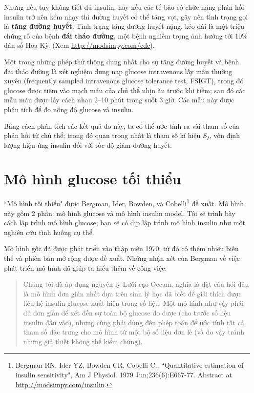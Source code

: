 \documentclass[12pt, openany]{book}
\theoremstyle{exercise}
\begin{document}
Nhưng nếu tuỵ không tiết đủ insulin, hay nếu các tế bào có chức năng phản hồi insulin trở nên kém nhạy thì đường huyết có thể tăng vọt, gây nên tình trạng gọi là {\bf tăng đường huyết}.  Tình trạng tăng đường huyết nặng, kéo dài là một triệu chứng rõ của bệnh {\bf đái tháo đường}, một bệnh nghiêm trọng ảnh hưởng tới 10\% dân số Hoa Kỳ. (Xem \url{http://modsimpy.com/cdc}).


Một trong những phép thử thông dụng nhất cho sự tăng đường huyết và bệnh đái tháo đường là xét nghiệm dung nạp glucose intravenous lấy mẫu thường xuyên (frequently sampled intravenous glucose tolerance test, FSIGT), trong đó glucose được tiêm vào mạch máu của chủ thể nhịn ăn trước khi tiêm; sau đó các mẫu máu được lấy cách nhau 2--10 phút trong suốt 3 giờ. Các mẫu này được phân tích để đo nồng độ glucose và insulin.


Bằng cách phân tích các kết quả đo này, ta có thể ước tính ra vài tham số của phản hồi từ chủ thể; trong đó quan trọng nhất là tham số kí hiệu $S_I$, vốn định lượng hiệu ứng insulin đối với tốc độ giảm đường huyết.


\section{Mô hình glucose tối thiểu}

``Mô hình tối thiểu" được Bergman, Ider, Bowden, và Cobelli\footnote{Bergman RN, Ider YZ, Bowden CR, Cobelli C., ``Quantitative estimation of insulin sensitivity", Am J Physiol. 1979 Jun;236(6):E667-77.  Abstract at \url{http://modsimpy.com/insulin}.} đề xuất.
Mô hình này gồm 2 phần: mô hình glucose và mô hình insulin model.  Tôi sẽ trình bày cách lập trình mô hình glucose; bạn sẽ có dịp lập trình mô hình insulin như một nghiên cứu tình huống cụ thể.


Mô hình gốc đã được phát triển vào thập niên 1970; từ đó có thêm nhiều biến thể và phiên bản mở rộng được đề xuất. Những nhận xét của Bergman về việc phát triển mô hình đã giúp ta hiểu thêm về công việc:

\begin{quote}
Chúng tôi đã áp dụng nguyên lý Lưỡi cạo Occam, nghĩa là đặt câu hỏi
đâu là mô hình đơn giản nhất dựa trên sinh lý học đã biết
để giải thích được liên hệ insulin-glucose 
xuất hiện trong số liệu. Một mô hình như vậy phải đủ
đơn giản để xét đến sự toàn bộ glucose đo được (cho trước
số liệu insulin đầu vào), nhưng cũng phải dùng đến
phép toán để ước tính tất cả tham số đặc trưng
cho mô hình từ một bộ số liệu đơn lẻ (và do vậy tránh
những giả thiết không thể kiểm chứng).
\end{quote}
\end{document}
